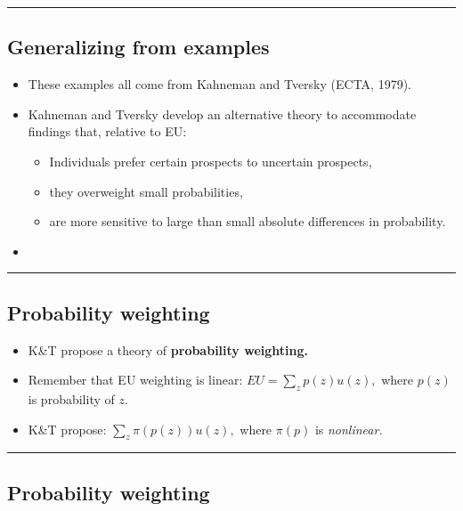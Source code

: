 \documentclass[
  letterpaper,
  DIV=11,
  numbers=noendperiod]{scrartcl}
\providecommand{\tightlist}{%
  \setlength{\itemsep}{0pt}\setlength{\parskip}{0pt}}\usepackage{longtable,booktabs,array}
\begin{document}
\begin{center}\rule{0.5\linewidth}{0.5pt}\end{center}

\subsection{Generalizing from
examples}\label{generalizing-from-examples}

\begin{itemize}
\tightlist
\item
  These examples all come from Kahneman and Tversky (ECTA, 1979).
\item
  Kahneman and Tversky develop an alternative theory to accommodate
  findings that, relative to EU:

  \begin{itemize}
  \tightlist
  \item
    Individuals prefer certain prospects to uncertain prospects,
  \item
    they overweight small probabilities,
  \item
    are more sensitive to large than small absolute differences in
    probability.
  \end{itemize}
\item
\end{itemize}

\begin{center}\rule{0.5\linewidth}{0.5pt}\end{center}

\subsection{Probability weighting}\label{probability-weighting}

\begin{itemize}
\tightlist
\item
  K\&T propose a theory of \textbf{probability weighting.}
\item
  Remember that EU weighting is linear: \(EU = \sum_z p(z)u(z),\) where
  \(p(z)\) is probability of \(z.\)
\item
  K\&T propose: \(\sum_z\pi(p(z))u(z),\) where \(\pi(p)\) is
  \emph{nonlinear.}
\end{itemize}

\begin{center}\rule{0.5\linewidth}{0.5pt}\end{center}

\subsection{Probability weighting}\label{probability-weighting-1}
\end{document}
